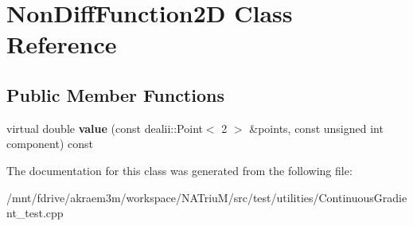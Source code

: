 \hypertarget{classNonDiffFunction2D}{
\section{NonDiffFunction2D Class Reference}
\label{classNonDiffFunction2D}
}
\subsection*{Public Member Functions}
\begin{DoxyCompactItemize}
\item 
\hypertarget{classNonDiffFunction2D_a8a7a1f45beedd8dfb20f1896b4ee917a}{
virtual double {\bfseries value} (const dealii::Point$<$ 2 $>$ \&points, const unsigned int component) const }
\label{classNonDiffFunction2D_a8a7a1f45beedd8dfb20f1896b4ee917a}

\end{DoxyCompactItemize}


The documentation for this class was generated from the following file:\begin{DoxyCompactItemize}
\item 
/mnt/fdrive/akraem3m/workspace/NATriuM/src/test/utilities/ContinuousGradient\_\-test.cpp\end{DoxyCompactItemize}
